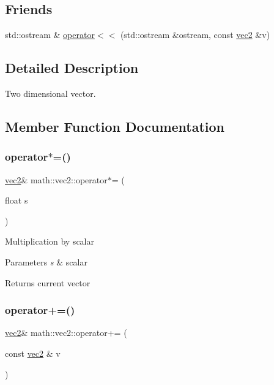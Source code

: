 \subsection*{Friends}
\begin{DoxyCompactItemize}
\item 
std\+::ostream \& \hyperlink{structmath_1_1vec2_acd0ced7ddd62abdb2a2afb8a37392037}{operator$<$$<$} (std\+::ostream \&ostream, const \hyperlink{structmath_1_1vec2}{vec2} \&v)
\end{DoxyCompactItemize}


\subsection{Detailed Description}
Two dimensional vector. 

\subsection{Member Function Documentation}
\mbox{\label{structmath_1_1vec2_a29bcd05742fc42c3cce9883693e81b75}} 
\subsubsection{\texorpdfstring{operator$\ast$=()}{operator*=()}}
{\footnotesize\ttfamily \hyperlink{structmath_1_1vec2}{vec2}\& math\+::vec2\+::operator$\ast$= (\begin{DoxyParamCaption}\item[{float}]{s }\end{DoxyParamCaption})\hspace{0.3cm}{\ttfamily [inline]}}

Multiplication by scalar 
\begin{DoxyParams}{Parameters}
{\em s} & scalar \\
\hline
\end{DoxyParams}
\begin{DoxyReturn}{Returns}
current vector 
\end{DoxyReturn}
\mbox{\label{structmath_1_1vec2_af99deb7c62b5c3e494854e6ba83f7422}} 
\subsubsection{\texorpdfstring{operator+=()}{operator+=()}}
{\footnotesize\ttfamily \hyperlink{structmath_1_1vec2}{vec2}\& math\+::vec2\+::operator+= (\begin{DoxyParamCaption}\item[{const \hyperlink{structmath_1_1vec2}{vec2} \&}]{v }\end{DoxyParamCaption})\hspace{0.3cm}{\ttfamily [inline]}}

